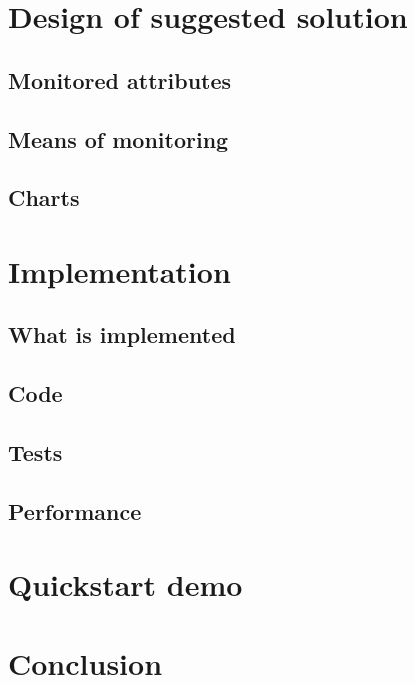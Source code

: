 \documentclass[12pt,oneside]{fithesis2}
\begin{document}
\chapter{Design of suggested solution}

\section{Monitored attributes}

\section{Means of monitoring}

\section{Charts}



\chapter{Implementation}

\section{What is implemented}

\section{Code}

\section{Tests}

\section{Performance}


\chapter{Quickstart demo}


\chapter{Conclusion}



\end{document}
